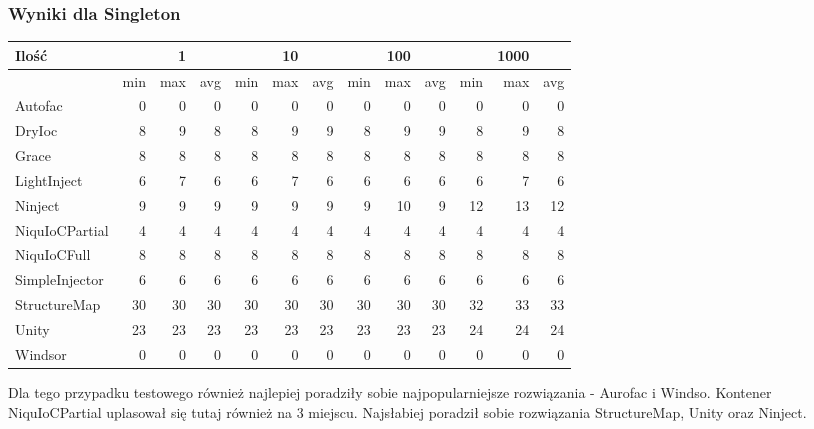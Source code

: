\documentclass[12pt]{article}
\begin{document}
\subsubsection{Wyniki dla Singleton}
\begin{center}
\begin{small}
	\begin{tabular}{ | l | r r r | r r r | r r r | r r r | }
    		\hline
     		Ilość & & 1 & & & 10 & & & 100 & & & 1000 & \\ \hline
     		 & min & max & avg & min & max & avg & min & max & avg & min & max & avg \\ \hline
    		Autofac & 0 & 0 & 0 & 0 & 0 & 0 & 0 & 0 & 0 & 0 & 0 & 0 \\ \hline
   		DryIoc & 8 & 9 & 8 & 8 & 9 & 9 & 8 & 9 & 9 & 8 & 9 & 8 \\ \hline
		Grace & 8 & 8 & 8 & 8 & 8 & 8 & 8 & 8 & 8 & 8 & 8 & 8 \\ \hline
		LightInject & 6 & 7 & 6 & 6 & 7 & 6 & 6 & 6 & 6 & 6 & 7 & 6 \\ \hline
		Ninject & 9 & 9 & 9 & 9 & 9 & 9 & 9 & 10 & 9 & 12 & 13 & 12 \\ \hline
		NiquIoCPartial & 4 & 4 & 4 & 4 & 4 & 4 & 4 & 4 & 4 & 4 & 4 & 4 \\ \hline
		NiquIoCFull & 8 & 8 & 8 & 8 & 8 & 8 & 8 & 8 & 8 & 8 & 8 & 8 \\ \hline
		SimpleInjector & 6 & 6 & 6 & 6 & 6 & 6 & 6 & 6 & 6 & 6 & 6 & 6 \\ \hline
		StructureMap & 30 & 30 & 30 & 30 & 30 & 30 & 30 & 30 & 30 & 32 & 33 & 33 \\ \hline
		Unity & 23 & 23 & 23 & 23 & 23 & 23 & 23 & 23 & 23 & 24 & 24 & 24 \\ \hline
		Windsor & 0 & 0 & 0 & 0 & 0 & 0 & 0 & 0 & 0 & 0 & 0 & 0 \\
    		\hline
  	\end{tabular}
\end{small}
\end{center}
Dla tego przypadku testowego również najlepiej poradziły sobie najpopularniejsze rozwiązania - Aurofac i Windso. Kontener NiquIoCPartial uplasował się tutaj również na 3 miejscu. Najsłabiej poradził sobie rozwiązania StructureMap, Unity oraz Ninject.

\clearpage
\end{document}
